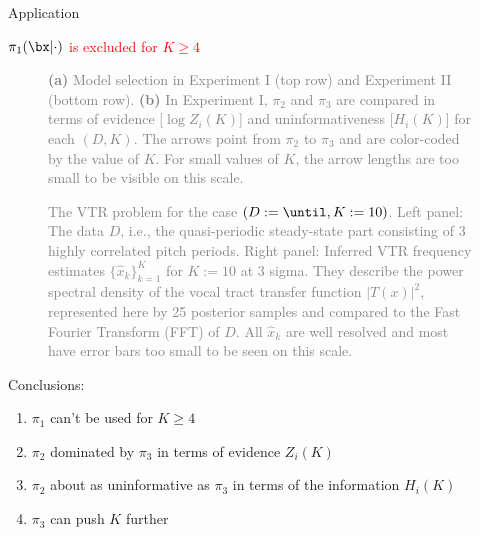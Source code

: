 \documentclass[10pt,xcolor={dvipsnames}]{beamer}
\newcommand{\pgffigure}[2]{%
\scalebox{#2}{}
}
\begin{document}
\begin{frame}[label=current]{Application}
\begin{overprint}
\begin{center}
\alert{\textcolor{red}{$\pi_1(\bx|\cdot)$ is excluded for $K \geq 4$}}
\end{center}

\onslide<+->
\begin{figure}[t]      
\centering
\subfloat[]{\pgffigure{bars.pgf}{.62}}
\qquad
\subfloat[]{\pgffigure{arrow.pgf}{.62}}
\caption{%
\footnotesize
\justifying
\textcolor{gray}{%
{\bf (a)}
Model selection in Experiment I (top row) and Experiment II (bottom row).
{\bf (b)}
In Experiment I, $\pi_2$ and $\pi_3$ are compared in terms of evidence [$\log{Z_i(K)}$] and uninformativeness [$H_i(K)$] for each $(D,K)$.
The arrows point from $\pi_2$ to $\pi_3$ and are color-coded by the value of $K$.
For small values of $K$, the arrow lengths are too small to be visible on this scale.
}
}
\end{figure}

\onslide<+->
\begin{figure}[t]
\pgffigure{spectrum.pgf}{.62}
\caption{%
\footnotesize
\justifying
\textcolor{gray}{%
The VTR problem for the case $(D := \until, K := 10)$.
Left panel:
The data $D$, i.e., the quasi-periodic steady-state part consisting of 3 highly correlated pitch periods.
Right panel:
Inferred VTR frequency estimates $\{\hat{x}_k\}_{k=1}^K$ for $K := 10$ at 3 sigma.
They describe the power spectral density of the vocal tract transfer function $|T(x)|^2$, represented here by 25 posterior samples and compared to the Fast Fourier Transform (FFT) of $D$.
All $\hat{x}_k$ are well resolved and most have error bars too small to be seen on this scale.
\label{spectrum}
}
}
\end{figure}

\onslide<+->

\begin{center}
\alert{Conclusions:}\\
\end{center}

\begin{enumerate}
\widesep
\item $\pi_1$ can't be used for $K \geq 4$
\item $\pi_2$ dominated by $\pi_3$ in terms of \alert{evidence} $Z_i(K)$
\item $\pi_2$ about as uninformative as $\pi_3$ in terms of the \alert{information} $H_i(K)$
\item $\pi_3$ can push $K$ further
\end{enumerate}

\end{overprint}
\end{frame}
\end{document}
